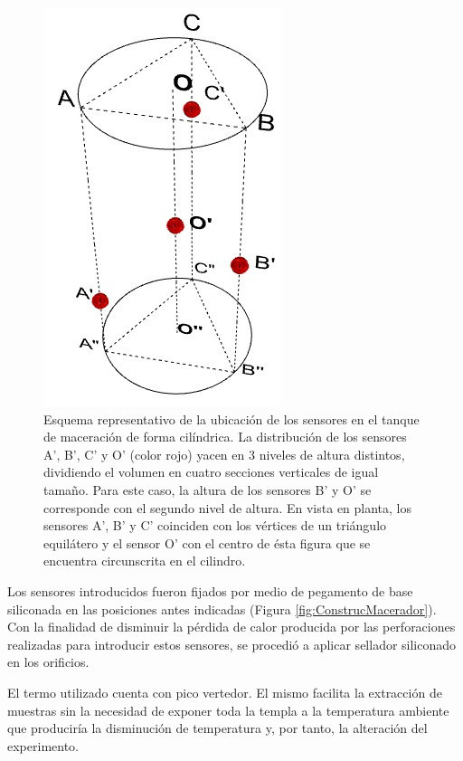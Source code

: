         \begin{figure}[h]
            \centering
            \includegraphics[scale=0.5]{Pruebas/UbicacionSensoresEnTanque-04.jpeg}
            \caption{Esquema representativo de la ubicación de los sensores en el tanque de maceración de forma cilíndrica. La distribución de los sensores A', B', C' y O' (color rojo) yacen en 3 niveles de altura distintos, dividiendo el volumen en cuatro secciones verticales de igual tamaño. Para este caso, la altura de los sensores B' y O' se corresponde con el segundo nivel de altura. En vista en planta, los sensores A', B' y C' coinciden con los vértices de un triángulo equilátero y el sensor O' con el centro de ésta figura que se encuentra circunscrita en el cilindro.}
            \label{fig:SensoresEnTanque}
        \end{figure}
        
        \par Los sensores introducidos fueron fijados por medio de pegamento de base siliconada en las posiciones antes indicadas  (Figura \ref{fig:ConstrucMacerador}). Con la finalidad de disminuir la pérdida de calor producida por las perforaciones realizadas para introducir estos sensores, se procedió a aplicar sellador siliconado  en los orificios.
        
        \par El termo utilizado cuenta con pico vertedor. El mismo facilita la extracción de muestras sin la necesidad de exponer toda la templa a la temperatura ambiente que produciría la disminución de temperatura y, por tanto, la alteración del experimento.
        
